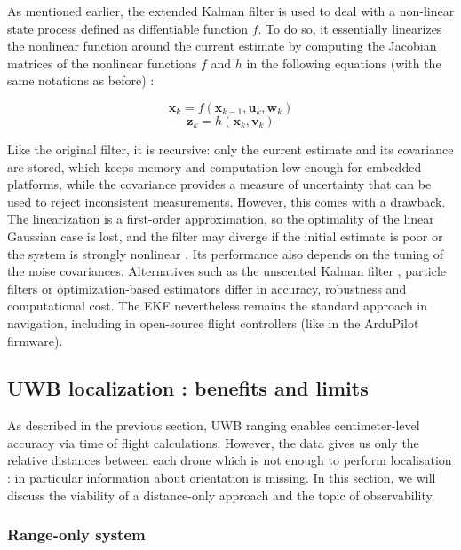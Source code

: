 As mentioned earlier, the extended Kalman filter is used to deal with a non-linear state process defined as diffentiable function $f$. To do so, it essentially linearizes the nonlinear function around the current estimate by computing the Jacobian matrices of the nonlinear functions $f$ and $h$ in the following equations (with the same notations as before) :

$$ {\displaystyle {\textbf {x}}_{k}=f({\textbf {x}}_{k-1},{\textbf {u}}_{k},{\textbf {w}}_{k})}$$
$${\displaystyle {\textbf {z}}_{k}=h({\textbf {x}}_{k},{\textbf {v}}_{k})}$$


Like the original filter, it is recursive: only the current estimate and its covariance are stored, which keeps memory and computation low enough for embedded platforms, while the covariance provides a measure of uncertainty that can be used to reject inconsistent measurements. However, this comes with a drawback. The linearization is a first-order approximation, so the optimality of the linear Gaussian case is lost, and the filter may diverge if the initial estimate is poor or the system is strongly nonlinear \parencite{boutayeb_convergence_1997}. Its performance also depends on the tuning of the noise covariances. Alternatives such as the unscented Kalman filter \parencite{julier_new_1997}, particle filters \parencite{arulampalam_tutorial_2002} or optimization-based estimators differ in accuracy, robustness and computational cost. The EKF nevertheless remains the standard approach in navigation, including in open-source flight controllers (like in the ArduPilot firmware).
\newpage

\subsection{UWB localization : benefits and limits }

As described in the previous section, UWB ranging enables centimeter-level accuracy via time of flight calculations. However, the data gives us only the relative distances between each drone which is not enough to perform localisation : in particular information about orientation is missing. In this section, we will discuss the viability of a distance-only approach and the topic of observability.

\subsubsection{Range-only system}

